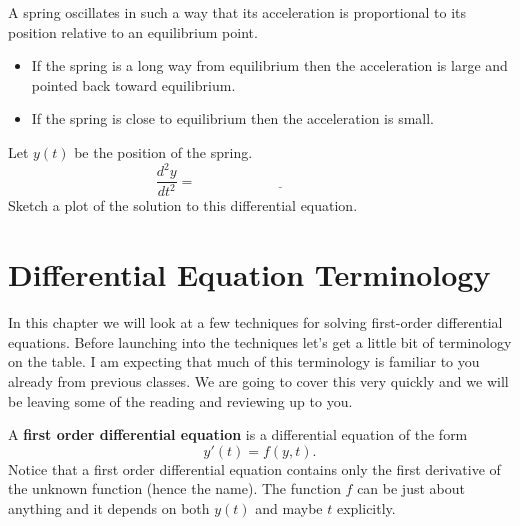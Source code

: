 \begin{problem}
    A spring oscillates in such a way that its acceleration is proportional to its
    position relative to an equilibrium point.
    \begin{itemize}
        \item If the spring is a long way from equilibrium then the acceleration is large
            and pointed back toward equilibrium.
        \item If the spring is close to equilibrium then the acceleration is small.
    \end{itemize}
    Let $y(t)$ be the position of the spring.
    \[ \frac{d^2 y}{dt^2} = \underline{\hspace{2in}} \]
    Sketch a plot of the solution to this differential equation.
\end{problem}
\solution{
    \[ \frac{d^2 y}{dt^2} = -ky \]
}


\newpage
\section{Differential Equation Terminology}
In this chapter we will look at a few techniques for solving first-order differential
equations.  Before launching into the techniques let's get a little bit of terminology on
the table.  I am expecting that much of this terminology is familiar to you already from
previous classes. We are going to cover this very quickly and we will be leaving some of
the reading and reviewing up to you.

\begin{definition}
    A {\bf first order differential equation} is a differential equation of the form 
    \[ y'(t) = f(y,t). \]
    Notice that a first order differential equation contains only the first derivative of
    the unknown function (hence the name).  The function $f$ can be just about anything
    and it depends on both $y(t)$ and maybe $t$ explicitly.
\end{definition}

